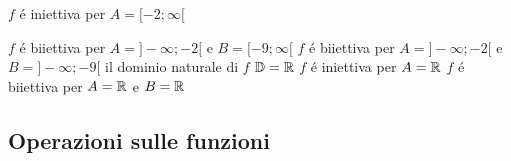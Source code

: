 \begin{questions}
\begin{qblock}
\begin{checkboxes}
            \CorrectChoice $f$ é iniettiva per $A=[-2;\infty[$

                        \choice $f$ é biiettiva per $A=]-\infty;-2[$ e $B=[-9;\infty[$
                        \CorrectChoice $f$ é biiettiva per $A=]-\infty;-2[$ e $B=]-\infty;-9[$
            \CorrectChoice il dominio naturale di $f$ $\mathbb{D}=\mathbb{R}$
            \CorrectChoice $f$ é iniettiva per $A=\mathbb{R}$
            \CorrectChoice $f$ é biiettiva per $A=\mathbb{R}$ e $B=\mathbb{R}$

        \end{checkboxes}
    \end{qblock}
\end{questions}

\subsection{Operazioni sulle funzioni}

